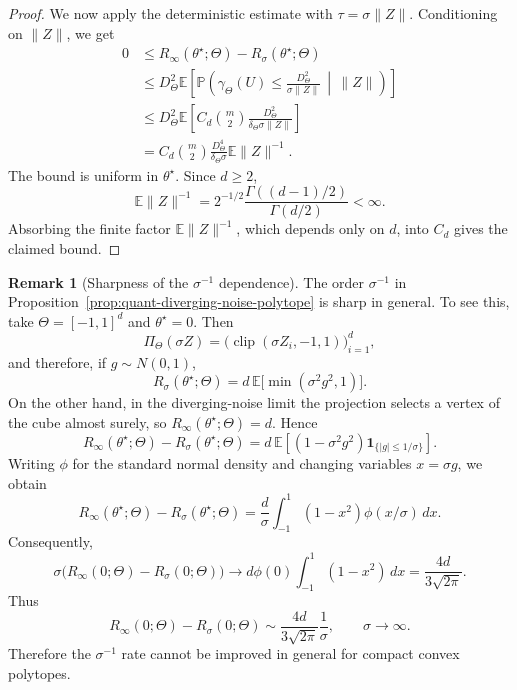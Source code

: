 \documentclass[11pt]{article}
\theoremstyle{plain}
\theoremstyle{definition}
\newtheorem*{remark}{Remark}
\newcommand{\E}{\mathbb{E}}
\renewcommand{\P}{\mathbb{P}}
\begin{document}
\begin{proof}
We now apply the deterministic estimate with
$\tau=\sigma\|Z\|$. Conditioning on $\|Z\|$, we get
\[
\begin{aligned}
0
&\le
R_\infty(\theta^\star;\Theta)
-
R_\sigma(\theta^\star;\Theta)  \\
&\le
D_{\Theta}^2
\E\left[
\P\left(
    \gamma_\Theta(U)
    \le
    \frac{D_{\Theta}^2}{\sigma\|Z\|}
    \,\middle|\, \|Z\|
\right)
\right] \\
&\le
D_{\Theta}^2
\E\left[
    C_d \binom{m}{2}
    \frac{D_{\Theta}^2}{\delta_\Theta\sigma\|Z\|}
\right] \\
&=
C_d \binom{m}{2}
\frac{D_{\Theta}^4}{\delta_\Theta\sigma}
\E\|Z\|^{-1}.
\end{aligned}
\]
The bound is uniform in $\theta^\star$. Since $d\ge2$,
\[
    \E\|Z\|^{-1}
    =
    2^{-1/2}
    \frac{\Gamma((d-1)/2)}{\Gamma(d/2)}
    <
    \infty.
\]
Absorbing the finite factor $\E\|Z\|^{-1}$, which depends only on $d$, into $C_d$
gives the claimed bound.
\end{proof}



\begin{remark}[Sharpness of the $\sigma^{-1}$ dependence]
The order $\sigma^{-1}$ in Proposition~\ref{prop:quant-diverging-noise-polytope}
is sharp in general. To see this, take $\Theta=[-1,1]^d$ and $\theta^\star=0$. Then
\[
    \Pi_\Theta(\sigma Z)
    =
    \bigl(\operatorname{clip}(\sigma Z_i,-1,1)\bigr)_{i=1}^d,
\]
and therefore, if $g\sim N(0,1)$,
\[
    R_\sigma(\theta^\star;\Theta)
    =
    d\,\E\bigl[\min(\sigma^2g^2,1)\bigr].
\]
On the other hand, in the diverging-noise limit the projection selects a vertex
of the cube almost surely, so $R_\infty(\theta^\star;\Theta)=d$. Hence
\[
    R_\infty(\theta^\star;\Theta)-R_\sigma(\theta^\star;\Theta)
    =
    d\,\E\left[
        (1-\sigma^2g^2)\mathbf 1_{\{|g|\le 1/\sigma\}}
    \right].
\]
Writing $\phi$ for the standard normal density and changing variables
$x=\sigma g$, we obtain
\[
    R_\infty(\theta^\star;\Theta)-R_\sigma(\theta^\star;\Theta)
    =
    \frac{d}{\sigma}
    \int_{-1}^{1}(1-x^2)\phi(x/\sigma)\,dx.
\]
Consequently,
\[
    \sigma\bigl(R_\infty(0;\Theta)-R_\sigma(0;\Theta)\bigr)
    \to
    d\phi(0)\int_{-1}^{1}(1-x^2)\,dx
    =
    \frac{4d}{3\sqrt{2\pi}}.
\]
Thus
\[
    R_\infty(0;\Theta)-R_\sigma(0;\Theta)
    \sim
    \frac{4d}{3\sqrt{2\pi}}\frac1\sigma,
    \qquad \sigma\to\infty.
\]
Therefore the $\sigma^{-1}$ rate cannot be improved in general for compact
convex polytopes.
\end{remark}
\end{document}
